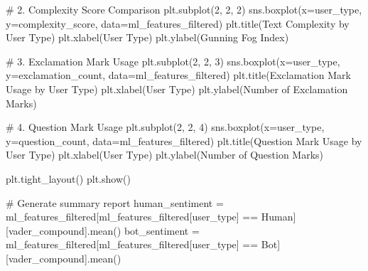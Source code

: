 \documentclass[
  12pt,
  letterpaper,
  DIV=11,
  numbers=noendperiod]{scrartcl}
\newenvironment{Shaded}{\begin{snugshade}}{\end{snugshade}}
\newcommand{\CommentTok}[1]{\textcolor[rgb]{0.37,0.37,0.37}{#1}}
\newcommand{\DecValTok}[1]{\textcolor[rgb]{0.68,0.00,0.00}{#1}}
\newcommand{\NormalTok}[1]{\textcolor[rgb]{0.00,0.23,0.31}{#1}}
\newcommand{\OperatorTok}[1]{\textcolor[rgb]{0.37,0.37,0.37}{#1}}
\newcommand{\StringTok}[1]{\textcolor[rgb]{0.13,0.47,0.30}{#1}}
\begin{document}
\begin{Shaded}
\begin{Highlighting}[]
\CommentTok{\# 2. Complexity Score Comparison}
\NormalTok{plt.subplot(}\DecValTok{2}\NormalTok{, }\DecValTok{2}\NormalTok{, }\DecValTok{2}\NormalTok{)}
\NormalTok{sns.boxplot(x}\OperatorTok{=}\StringTok{\textquotesingle{}user\_type\textquotesingle{}}\NormalTok{, y}\OperatorTok{=}\StringTok{\textquotesingle{}complexity\_score\textquotesingle{}}\NormalTok{, data}\OperatorTok{=}\NormalTok{ml\_features\_filtered)}
\NormalTok{plt.title(}\StringTok{\textquotesingle{}Text Complexity by User Type\textquotesingle{}}\NormalTok{)}
\NormalTok{plt.xlabel(}\StringTok{\textquotesingle{}User Type\textquotesingle{}}\NormalTok{)}
\NormalTok{plt.ylabel(}\StringTok{\textquotesingle{}Gunning Fog Index\textquotesingle{}}\NormalTok{)}

\CommentTok{\# 3. Exclamation Mark Usage}
\NormalTok{plt.subplot(}\DecValTok{2}\NormalTok{, }\DecValTok{2}\NormalTok{, }\DecValTok{3}\NormalTok{)}
\NormalTok{sns.boxplot(x}\OperatorTok{=}\StringTok{\textquotesingle{}user\_type\textquotesingle{}}\NormalTok{, y}\OperatorTok{=}\StringTok{\textquotesingle{}exclamation\_count\textquotesingle{}}\NormalTok{, data}\OperatorTok{=}\NormalTok{ml\_features\_filtered)}
\NormalTok{plt.title(}\StringTok{\textquotesingle{}Exclamation Mark Usage by User Type\textquotesingle{}}\NormalTok{)}
\NormalTok{plt.xlabel(}\StringTok{\textquotesingle{}User Type\textquotesingle{}}\NormalTok{)}
\NormalTok{plt.ylabel(}\StringTok{\textquotesingle{}Number of Exclamation Marks\textquotesingle{}}\NormalTok{)}

\CommentTok{\# 4. Question Mark Usage}
\NormalTok{plt.subplot(}\DecValTok{2}\NormalTok{, }\DecValTok{2}\NormalTok{, }\DecValTok{4}\NormalTok{)}
\NormalTok{sns.boxplot(x}\OperatorTok{=}\StringTok{\textquotesingle{}user\_type\textquotesingle{}}\NormalTok{, y}\OperatorTok{=}\StringTok{\textquotesingle{}question\_count\textquotesingle{}}\NormalTok{, data}\OperatorTok{=}\NormalTok{ml\_features\_filtered)}
\NormalTok{plt.title(}\StringTok{\textquotesingle{}Question Mark Usage by User Type\textquotesingle{}}\NormalTok{)}
\NormalTok{plt.xlabel(}\StringTok{\textquotesingle{}User Type\textquotesingle{}}\NormalTok{)}
\NormalTok{plt.ylabel(}\StringTok{\textquotesingle{}Number of Question Marks\textquotesingle{}}\NormalTok{)}

\NormalTok{plt.tight\_layout()}
\NormalTok{plt.show()}

\CommentTok{\# Generate summary report}
\NormalTok{human\_sentiment }\OperatorTok{=}\NormalTok{ ml\_features\_filtered[ml\_features\_filtered[}\StringTok{\textquotesingle{}user\_type\textquotesingle{}}\NormalTok{] }\OperatorTok{==} \StringTok{\textquotesingle{}Human\textquotesingle{}}\NormalTok{][}\StringTok{\textquotesingle{}vader\_compound\textquotesingle{}}\NormalTok{].mean()}
\NormalTok{bot\_sentiment }\OperatorTok{=}\NormalTok{ ml\_features\_filtered[ml\_features\_filtered[}\StringTok{\textquotesingle{}user\_type\textquotesingle{}}\NormalTok{] }\OperatorTok{==} \StringTok{\textquotesingle{}Bot\textquotesingle{}}\NormalTok{][}\StringTok{\textquotesingle{}vader\_compound\textquotesingle{}}\NormalTok{].mean()}


\end{Highlighting}
\end{Shaded}
\end{document}
